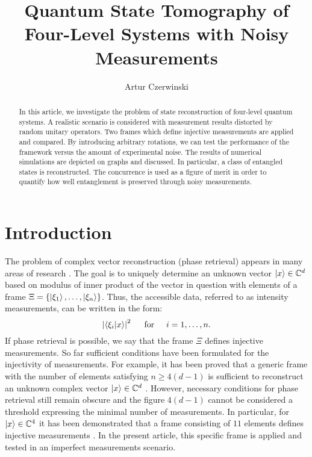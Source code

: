 \documentclass[aps,pra,reprint,groupedaddress,showkeys]{revtex4-1}
\begin{document}
\title{Quantum State Tomography of Four-Level Systems with Noisy Measurements}
\author{Artur Czerwinski \hspace{0.001cm}}

\begin{abstract}
In this article, we investigate the problem of state reconstruction of four-level quantum systems. A realistic scenario is considered with measurement results distorted by random unitary operators. Two frames which define injective measurements are applied and compared. By introducing arbitrary rotations, we can test the performance of the framework versus the amount of experimental noise. The results of numerical simulations are depicted on graphs and discussed. In particular, a class of entangled states is reconstructed. The concurrence is used as a figure of merit in order to quantify how well entanglement is preserved through noisy measurements.
\end{abstract}
\maketitle

\section{Introduction}

The problem of complex vector reconstruction (phase retrieval) appears in many areas of research \cite{Cahill2015,Jaganathan2016}. The goal is to uniquely determine an unknown vector $\ket{x} \in \mathbb{C}^d$ based on modulus of inner product of the vector in question with elements of a frame $\Xi =\{\ket{\xi_1}, \dots, \ket{\xi_n} \}$. Thus, the accessible data, referred to as intensity measurements, can be written in the form:
\begin{equation}\label{i1}
\left|\braket{\xi_i | x}\right|^2 \hspace{0.5cm}\text{for}\hspace{0.5cm} i=1,\dots, n.
\end{equation}
If phase retrieval is possible, we say that the frame $\Xi$ defines injective measurements. So far sufficient conditions have been formulated for the injectivity of measurements. For example, it has been proved that a generic frame with the number of elements satisfying $n \geq 4 (d-1)$ is sufficient to reconstruct an unknown complex vector $\ket{x}\in\mathbb{C}^d$ \cite{bandeiraa14,conca15}. However, necessary conditions for phase retrieval still remain obscure and the figure $4 (d-1)$ cannot be considered a threshold expressing the minimal number of measurements. In particular, for $\ket{x}\in\mathbb{C}^4$ it has been demonstrated that a frame consisting of $11$ elements defines injective measurements \cite{vinzant15}. In the present article, this specific frame is applied and tested in an imperfect measurements scenario.
\end{document}
